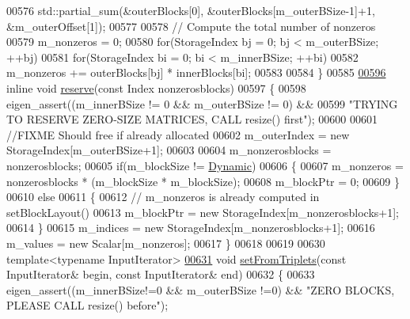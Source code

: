 \begin{DoxyCode}
00576       std::partial\_sum(&outerBlocks[0], &outerBlocks[m\_outerBSize-1]+1, &m\_outerOffset[1]);
00577 
00578       \textcolor{comment}{// Compute the total number of nonzeros}
00579       m\_nonzeros = 0;
00580       \textcolor{keywordflow}{for}(StorageIndex bj = 0; bj < m\_outerBSize; ++bj)
00581         \textcolor{keywordflow}{for}(StorageIndex bi = 0; bi < m\_innerBSize; ++bi)
00582           m\_nonzeros += outerBlocks[bj] * innerBlocks[bi];
00583 
00584     \}
00585 
\hyperlink{group___sparse_core___module_a2e1814d2fb4d66320ce3ec97303d0648}{00596}     \textcolor{keyword}{inline} \textcolor{keywordtype}{void} \hyperlink{group___sparse_core___module_a2e1814d2fb4d66320ce3ec97303d0648}{reserve}(\textcolor{keyword}{const} Index nonzerosblocks)
00597     \{
00598       eigen\_assert((m\_innerBSize != 0 && m\_outerBSize != 0) &&
00599           \textcolor{stringliteral}{"TRYING TO RESERVE ZERO-SIZE MATRICES, CALL resize() first"});
00600 
00601       \textcolor{comment}{//FIXME Should free if already allocated}
00602       m\_outerIndex = \textcolor{keyword}{new} StorageIndex[m\_outerBSize+1];
00603 
00604       m\_nonzerosblocks = nonzerosblocks;
00605       \textcolor{keywordflow}{if}(m\_blockSize != \hyperlink{namespace_eigen_ad81fa7195215a0ce30017dfac309f0b2}{Dynamic})
00606       \{
00607         m\_nonzeros = nonzerosblocks * (m\_blockSize * m\_blockSize);
00608         m\_blockPtr = 0;
00609       \}
00610       \textcolor{keywordflow}{else}
00611       \{
00612         \textcolor{comment}{// m\_nonzeros  is already computed in setBlockLayout()}
00613         m\_blockPtr = \textcolor{keyword}{new} StorageIndex[m\_nonzerosblocks+1];
00614       \}
00615       m\_indices = \textcolor{keyword}{new} StorageIndex[m\_nonzerosblocks+1];
00616       m\_values = \textcolor{keyword}{new} Scalar[m\_nonzeros];
00617     \}
00618 
00619 
00630     \textcolor{keyword}{template}<\textcolor{keyword}{typename} InputIterator>
\hyperlink{group___sparse_core___module_aa148b63f89555f4eed312638abe597eb}{00631}     \textcolor{keywordtype}{void} \hyperlink{group___sparse_core___module_aa148b63f89555f4eed312638abe597eb}{setFromTriplets}(\textcolor{keyword}{const} InputIterator& begin, \textcolor{keyword}{const} InputIterator& end)
00632     \{
00633       eigen\_assert((m\_innerBSize!=0 && m\_outerBSize !=0) && \textcolor{stringliteral}{"ZERO BLOCKS, PLEASE CALL resize() before"});

\end{DoxyCode}
